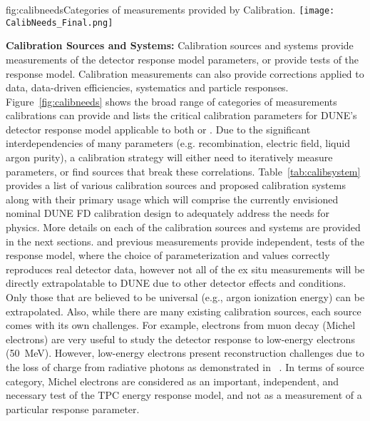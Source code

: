 \begin{dunefigure}{fig:calibneeds}{Categories of measurements provided by Calibration.}
\texttt{[image: CalibNeeds\_Final.png]}
\end{dunefigure}

\textbf{Calibration Sources and Systems:} Calibration sources and systems provide measurements of the detector response model parameters, or provide tests of the response model. 
Calibration measurements can also provide corrections applied to data, data-driven efficiencies, systematics and particle responses. Figure~\ref{fig:calibneeds} shows the broad range of categories of measurements calibrations can provide and lists the critical calibration parameters for DUNE's detector response model applicable to both  or . Due to the significant interdependencies of many parameters (e.g. recombination, electric field, liquid argon purity), a calibration strategy will either need to iteratively measure parameters, or find sources that break these correlations. Table~\ref{tab:calibsystem} provides a list of various calibration sources and proposed calibration systems along with their primary usage which will comprise the currently envisioned nominal DUNE FD calibration design to adequately address the needs for physics. More details on each of the calibration sources and systems are provided in the next sections.  and previous measurements provide independent, tests of the response model, where the choice of parameterization and values correctly reproduces real detector data, however not all of the ex situ measurements will be directly extrapolatable to DUNE due to other detector effects and conditions. Only those that are believed to be universal (e.g., argon ionization energy) can be extrapolated. Also, while there are many existing calibration sources, each source comes with its own challenges. For example, electrons from muon decay (Michel electrons) are very useful to study the detector response to low-energy electrons (\SI{50}{\MeV}). However, low-energy electrons present reconstruction challenges due to the loss of charge from radiative photons as demonstrated in ~\cite{Acciarri:2017sjy}. In terms of source category, Michel electrons are considered as an important, independent, and necessary test of the TPC energy response model, and not as a measurement of a particular response parameter.

